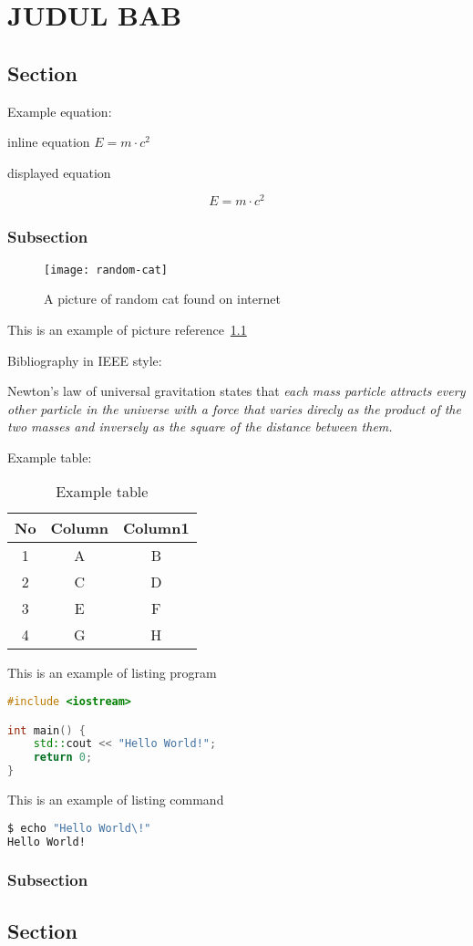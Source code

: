 \chapter{JUDUL BAB}
\section{Section}
\lipsum[1]
Example equation:

inline equation $E=m\cdot c^2$

displayed equation

\begin{equation}
    E=m\cdot c^2
\end{equation}

\subsection{Subsection}

\begin{figure}[H]
    \centering
    \texttt{[image: random-cat]}
    \caption{A picture of random cat found on internet}\label{random-cat}
\end{figure}

This is an example of picture reference~\cref{random-cat}

Bibliography in IEEE style:

Newton's law of universal gravitation states that \textit{each mass particle attracts every other particle in the universe with a force that varies direcly as the product of the two masses and inversely as the square of the distance between them.}~\autocite{book:classical}

Example table:

\begin{table}[H]
    \centering
    \caption{Example table}\label{table1}
    \begin{tabular}{ccc}
        \toprule
        No & Column & Column1 \\
        \midrule
        1  & A      & B       \\
        2  & C      & D       \\
        3  & E      & F       \\
        4  & G      & H       \\
        \bottomrule
    \end{tabular}
\end{table}

This is an example of listing program
\begin{lstlisting}[language=c++, caption={C++ Hello World!}, style=box]
#include <iostream>

int main() {
    std::cout << "Hello World!";
    return 0;
}
\end{lstlisting}

This is an example of listing command
\begin{lstlisting}[language=bash, caption={Bash command}, style=command]
$ echo "Hello World\!"
Hello World!
\end{lstlisting}

\lipsum[1]
\subsection{Subsection}
\lipsum[1]
\section{Section}
\lipsum[2]

